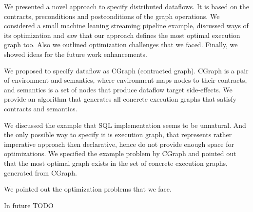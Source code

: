 We presented a novel approach to specify distributed dataflows.
It is based on the contracts, preconditions and postconditions of the graph operations.
We considered a small machine leaning streaming pipeline example, discussed ways of its optimization and saw that our approach defines the most optimal execution graph too.
Also we outlined optimization challenges that we faced.
Finally, we showed ideas for the future work enhancements.

We proposed to specify dataflow as CGraph (contracted graph).
CGraph is a pair of environment and semantics, where environment maps nodes to their contracts, and semantics is a set of nodes that produce dataflow target side-effects.
We provide an algorithm that generates all concrete execution graphs that satisfy contracts and semantics.

We discussed the example that SQL implementation seems to be unnatural.
And the only possible way to specify it is execution graph, that represents rather imperative approach then declarative, hence do not provide enough space for optimizations.
We specified the example problem by CGraph and pointed out that the most optimal graph exists in the set of concrete execution graphs, generated from CGraph.

We pointed out the optimization problems that we face.

In future TODO
